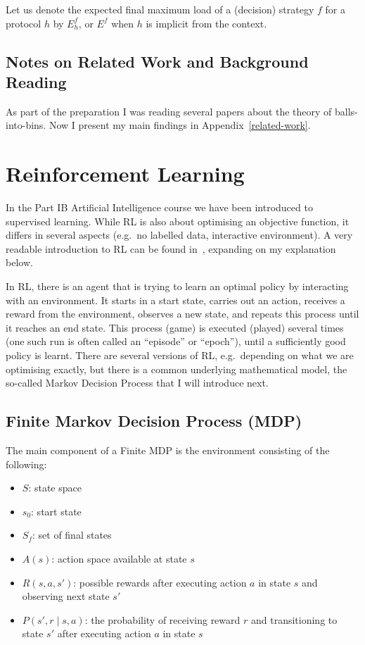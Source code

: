 \begin{definition} 
Let us denote the expected final maximum load of a (decision) strategy $f$ for a protocol $h$ by $E^f_h$, or $E^f$ when $h$ is implicit from the context.
\end{definition}



\subsection{Notes on Related Work and Background Reading}

As part of the preparation I was reading several papers about the theory of balls-into-bins. Now I present my main findings in Appendix~\ref{related-work}.



\section{Reinforcement Learning} \label{RLintro}


In the Part IB Artificial Intelligence course we have been introduced to supervised learning. While RL is also about optimising an objective function, it differs in several aspects (e.g.\ no labelled data, interactive environment). A very readable introduction to RL can be found in~\cite{sutton2018RLbook}, expanding on my explanation below.


In RL, there is an agent that is trying to learn an optimal policy by interacting with an environment. It starts in a start state, carries out an action, receives a reward from the environment, observes a new state, and repeats this process until it reaches an end state. This process (game) is executed (played) several times (one such run is often called an ``episode'' or ``epoch''), until a sufficiently good policy is learnt. There are several versions of RL, e.g.\ depending on what we are optimising exactly, but there is a common underlying mathematical model, the so-called Markov Decision Process that I will introduce next.

\subsection{Finite Markov Decision Process (MDP)}


The main component of a Finite MDP is the environment consisting of the following:
\begin{itemize}[itemsep=0pt]
    \item $S$: state space
    \item $s_0$: start state
    \item $S_f$: set of final states
    \item $A(s)$: action space available at state $s$
    \item $R(s, a, s')$: possible rewards after executing action $a$ in state $s$ and observing next state $s'$
    \item $P(s', r \mid s, a)$: the probability of receiving reward $r$ and transitioning to state $s'$ after executing action $a$ in state $s$
\end{itemize} 


